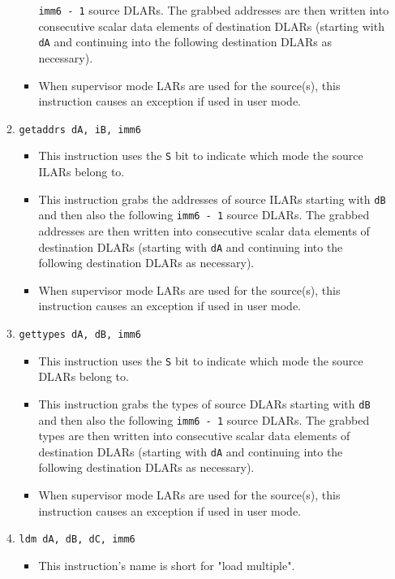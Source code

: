 \documentclass{article}
\begin{document}
\begin{itemize}
\begin{enumerate}
\begin{itemize}
					\texttt{imm6 - 1} source DLARs. The grabbed addresses
					are then written into consecutive scalar data elements
					of destination DLARs (starting with \texttt{dA} and
					continuing into the following destination DLARs as
					necessary).
				\item When supervisor mode LARs are used for the source(s),
					this instruction causes an exception if used in user
					mode.
				\end{itemize}
			\item \texttt{getaddrs dA, iB, imm6}
				\begin{itemize}
				\item This instruction uses the \texttt{S} bit to indicate
					which mode the source ILARs belong to.
				\item This instruction grabs the addresses of source ILARs
					starting with \texttt{dB} and then also the following
					\texttt{imm6 - 1} source DLARs. The grabbed addresses
					are then written into consecutive scalar data elements
					of destination DLARs (starting with \texttt{dA} and
					continuing into the following destination DLARs as
					necessary).
				\item When supervisor mode LARs are used for the source(s),
					this instruction causes an exception if used in user
					mode.
				\end{itemize}
			\item \texttt{gettypes dA, dB, imm6}
				\begin{itemize}
				\item This instruction uses the \texttt{S} bit to indicate
					which mode the source DLARs belong to.
				\item This instruction grabs the types of source DLARs
					starting with \texttt{dB} and then also the following
					\texttt{imm6 - 1} source DLARs. The grabbed types are
					then written into consecutive scalar data elements of
					destination DLARs (starting with \texttt{dA} and
					continuing into the following destination DLARs as
					necessary).
				\item When supervisor mode LARs are used for the source(s),
					this instruction causes an exception if used in user
					mode.
				\end{itemize}
			\item \texttt{ldm dA, dB, dC, imm6}
				\begin{itemize}
				\item This instruction's name is short for "load multiple".

\end{itemize}
\end{enumerate}
\end{itemize}
\end{document}
